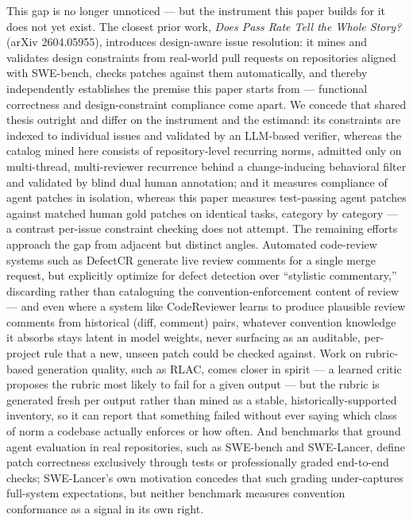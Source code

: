 \documentclass[11pt]{article}
\begin{document}
This gap is no longer unnoticed --- but the instrument this paper builds for it does not yet exist. The closest prior work, \textit{Does Pass Rate Tell the Whole Story?} (arXiv 2604.05955), introduces design-aware issue resolution: it mines and validates design constraints from real-world pull requests on repositories aligned with SWE-bench, checks patches against them automatically, and thereby independently establishes the premise this paper starts from --- functional correctness and design-constraint compliance come apart. We concede that shared thesis outright and differ on the instrument and the estimand: its constraints are indexed to individual issues and validated by an LLM-based verifier, whereas the catalog mined here consists of repository-level recurring norms, admitted only on multi-thread, multi-reviewer recurrence behind a change-inducing behavioral filter and validated by blind dual human annotation; and it measures compliance of agent patches in isolation, whereas this paper measures test-passing agent patches against matched human gold patches on identical tasks, category by category --- a contrast per-issue constraint checking does not attempt. The remaining efforts approach the gap from adjacent but distinct angles. Automated code-review systems such as DefectCR generate live review comments for a single merge request, but explicitly optimize for defect detection over ``stylistic commentary,'' discarding rather than cataloguing the convention-enforcement content of review --- and even where a system like CodeReviewer learns to produce plausible review comments from historical (diff, comment) pairs, whatever convention knowledge it absorbs stays latent in model weights, never surfacing as an auditable, per-project rule that a new, unseen patch could be checked against. Work on rubric-based generation quality, such as RLAC, comes closer in spirit --- a learned critic proposes the rubric most likely to fail for a given output --- but the rubric is generated fresh per output rather than mined as a stable, historically-supported inventory, so it can report that something failed without ever saying which class of norm a codebase actually enforces or how often. And benchmarks that ground agent evaluation in real repositories, such as SWE-bench and SWE-Lancer, define patch correctness exclusively through tests or professionally graded end-to-end checks; SWE-Lancer's own motivation concedes that such grading under-captures full-system expectations, but neither benchmark measures convention conformance as a signal in its own right.
\end{document}
